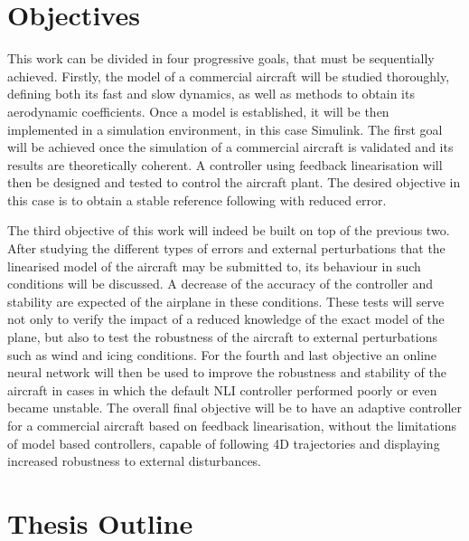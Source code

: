\section{Objectives}
\label{section:objectives}

This work can be divided in four progressive goals, that must be sequentially achieved. Firstly, the model of a commercial aircraft will be studied thoroughly, defining both its fast and slow dynamics, as well as methods to obtain its aerodynamic coefficients. Once a model is established, it will be then implemented in a simulation environment, in this case Simulink. The first goal will be achieved once the simulation of a commercial aircraft is validated and its results are theoretically coherent. A controller using feedback linearisation will then be designed and tested to control the aircraft plant. The desired objective in this case is to obtain a stable reference following with reduced error.

The third objective of this work will indeed be built on top of the previous two. After studying the different types of errors and external perturbations that the linearised model of the aircraft may be submitted to, its behaviour in such conditions will be discussed. A decrease of the accuracy of the controller and stability are expected of the airplane in these conditions.
These tests will serve not only to verify the impact of a reduced knowledge of the exact model of the plane, but also to test the robustness of the aircraft to external perturbations such as wind and icing conditions. For the fourth and last objective an online neural network will then be used to improve the robustness and stability of the aircraft in cases in which the default NLI controller performed poorly or even became unstable. The overall final objective will be to have an adaptive controller for a commercial aircraft based on feedback linearisation, without the limitations of model based controllers, capable of following 4D trajectories and displaying increased robustness to external disturbances. 






\section{Thesis Outline}
\label{section:outline}

